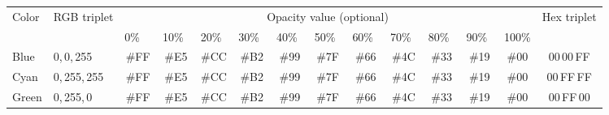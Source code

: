 \begin{infobox}
\noindent \begin{centering}
\renewcommand{\tabcolsep}{2.9pt}%
\begin{tabular}{llcccccccccccc}
\toprule 
\multirow{2}{*}{{\footnotesize Color}} & \multirow{2}{*}{{\footnotesize RGB triplet}} & \multicolumn{11}{c}{{\footnotesize Opacity value (optional)}} & \multirow{2}{*}{{\footnotesize Hex triplet}}\tabularnewline
 &  & {\footnotesize 0\%~~} & {\footnotesize 10\%~} & {\footnotesize 20\%~} & {\footnotesize 30\%~} & {\footnotesize 40\%~} & {\footnotesize 50\%~} & {\footnotesize 60\%~} & {\footnotesize 70\%~} & {\footnotesize 80\%~} & {\footnotesize 90\%~} & {\footnotesize 100\%} & \tabularnewline
\midrule
{\footnotesize Blue } & \multicolumn{1}{l}{{\footnotesize 0,\,0,\,255}} & {\footnotesize \cellcolor{blue}\#FF} & {\footnotesize \cellcolor{blue!90!shadecolor}\#E5} & {\footnotesize \cellcolor{blue!80!shadecolor}\#CC} & {\footnotesize \cellcolor{blue!70!shadecolor}\#B2} & {\footnotesize \cellcolor{blue!60!shadecolor}\#99} & {\footnotesize \cellcolor{blue!50!shadecolor}\#7F} & {\footnotesize \cellcolor{blue!40!shadecolor}\#66} & {\footnotesize \cellcolor{blue!30!shadecolor}\#4C} & {\footnotesize \cellcolor{blue!20!shadecolor}\#33} & {\footnotesize \cellcolor{blue!10!shadecolor}\#19} & {\footnotesize \#00} & {\footnotesize \cellcolor{blue!100!shadecolor}00\,00\,FF}\tabularnewline
{\footnotesize Cyan} & \multicolumn{1}{l}{{\footnotesize 0,\,255,\,255}} & {\footnotesize \cellcolor{ijcyan}\#FF} & {\footnotesize \cellcolor{ijcyan!90!shadecolor}\#E5} & {\footnotesize \cellcolor{ijcyan!80!shadecolor}\#CC} & {\footnotesize \cellcolor{ijcyan!70!shadecolor}\#B2} & {\footnotesize \cellcolor{ijcyan!60!shadecolor}\#99} & {\footnotesize \cellcolor{ijcyan!50!shadecolor}\#7F} & {\footnotesize \cellcolor{ijcyan!40!shadecolor}\#66} & {\footnotesize \cellcolor{ijcyan!30!shadecolor}\#4C} & {\footnotesize \cellcolor{ijcyan!20!shadecolor}\#33} & {\footnotesize \cellcolor{ijcyan!10!shadecolor}\#19} & {\footnotesize \#00} & {\footnotesize \cellcolor{ijcyan!100!shadecolor}00\,FF\,FF}\tabularnewline
{\footnotesize Green} & \multicolumn{1}{l}{{\footnotesize 0,\,255,\,0}} & {\footnotesize \cellcolor{green}\#FF} & {\footnotesize \cellcolor{green!90!shadecolor}\#E5} & {\footnotesize \cellcolor{green!80!shadecolor}\#CC} & {\footnotesize \cellcolor{green!70!shadecolor}\#B2} & {\footnotesize \cellcolor{green!60!shadecolor}\#99} & {\footnotesize \cellcolor{green!50!shadecolor}\#7F} & {\footnotesize \cellcolor{green!40!shadecolor}\#66} & {\footnotesize \cellcolor{green!30!shadecolor}\#4C} & {\footnotesize \cellcolor{green!20!shadecolor}\#33} & {\footnotesize \cellcolor{green!10!shadecolor}\#19} & {\footnotesize \#00} & {\footnotesize \cellcolor{green!100!shadecolor}00\,FF\,00}\tabularnewline

\end{tabular}
\end{centering}
\end{infobox}

